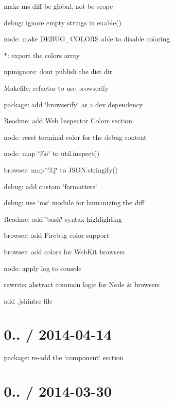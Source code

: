 \begin{DoxyItemize}
\item make ms diff be global, not be scope
\item debug\+: ignore empty strings in enable()
\item node\+: make D\+E\+B\+U\+G\+\_\+\+C\+O\+L\+O\+RS able to disable coloring
\item $\ast$\+: export the {\ttfamily colors} array
\item npmignore\+: don\textquotesingle{}t publish the {\ttfamily dist} dir
\item Makefile\+: refactor to use browserify
\item package\+: add \char`\"{}browserify\char`\"{} as a dev dependency
\item Readme\+: add Web Inspector Colors section
\item node\+: reset terminal color for the debug content
\item node\+: map \char`\"{}\%o\char`\"{} to {\ttfamily util.\+inspect()}
\item browser\+: map \char`\"{}\%j\char`\"{} to {\ttfamily J\+S\+O\+N.\+stringify()}
\item debug\+: add custom \char`\"{}formatters\char`\"{}
\item debug\+: use \char`\"{}ms\char`\"{} module for humanizing the diff
\item Readme\+: add \char`\"{}bash\char`\"{} syntax highlighting
\item browser\+: add Firebug color support
\item browser\+: add colors for Web\+Kit browsers
\item node\+: apply log to {\ttfamily console}
\item rewrite\+: abstract common logic for Node \& browsers
\item add .jshintrc file
\end{DoxyItemize}

\section*{0.. / 2014-\/04-\/14 }


\begin{DoxyItemize}
\item package\+: re-\/add the \char`\"{}component\char`\"{} section
\end{DoxyItemize}

\section*{0.. / 2014-\/03-\/30 }


